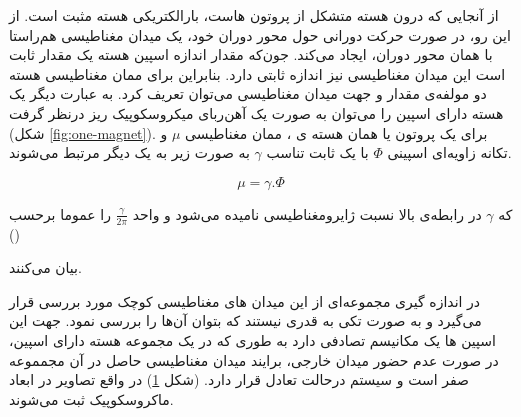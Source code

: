 از آنجایی که درون هسته متشکل از پروتون هاست، بارالکتریکی هسته مثبت است. از این رو، در صورت حرکت دورانی حول محور دوران خود، یک میدان مغناطیسی هم‌راستا با همان محور دوران، ایجاد می‌کند. جون‌که مقدار اندازه اسپین هسته یک مقدار ثابت است این میدان مغناطیسی نیز اندازه ثابتی دارد. بنابراین برای ممان مغناطیسی هسته
دو مولفه‌ی مقدار و جهت میدان مغناطیسی می‌توان تعریف کرد. به عبارت دیگر یک هسته دارای اسپین را می‌توان به صورت یک آهن‌ربای میکروسکوپیک ریز درنظر گرفت
(شکل \ref{fig:one-magnet}).
برای یک پروتون یا همان هسته ی ، ممان مغناطیسی $\mu$ و تکانه زاویه‌ای اسپینی
$\Phi$
با یک ثابت تناسب $\gamma$ به صورت زیر به یک دیگر مرتبط می‌شوند.

\removevspace
\begin{equation}\label{eq:mu=gamma.phi}
	\mu = \gamma . \Phi
\end{equation}

که $\gamma$ در رابطه‌ی بالا نسبت ژایرومغناطیسی 
نامیده می‌شود و واحد  $\frac{\gamma}{2\pi}$
را عموما برحسب ()

بیان می‌کنند.



\begin{figure}[t]
	\centering
	\caption{}
	\label{fig:balance-spin}
\end{figure}


در اندازه گیری \mr مجموعه‌ای از این میدان های مغناطیسی کوچک مورد بررسی قرار می‌گیرد و به صورت تکی به قدری نیستند که بتوان آن‌ها را بررسی نمود. جهت این اسپین ها یک مکانیسم تصادفی دارد به طوری که در یک مجموعه هسته دارای اسپین، در صورت عدم حضور میدان خارجی، برایند میدان مغناطیسی حاصل در آن مجمموعه صفر است و سیستم درحالت تعادل قرار دارد. 
(شکل \ref{fig:balance-spin}) در واقع تصاویر \mri در ابعاد ماکروسکوپیک ثبت می‌شوند.


